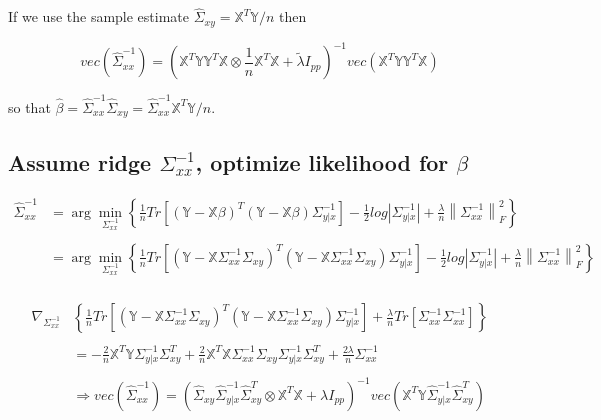 \documentclass[11pt,]{book}
\theoremstyle{definition}
\theoremstyle{definition}
\theoremstyle{definition}
\theoremstyle{remark}
\begin{document}
If we use the sample estimate
\(\hat{\Sigma}_{xy} = \mathbb{X}^{T}\mathbb{Y}/n\) then

\[ vec\left( \hat{\Sigma}_{xx}^{-1} \right) = \left( \mathbb{X}^{T}\mathbb{Y}\mathbb{Y}^{T}\mathbb{X} \otimes \frac{1}{n}\mathbb{X}^{T}\mathbb{X} + \tilde{\lambda}I_{pp} \right)^{-1}vec\left( \mathbb{X}^{T}\mathbb{Y}\mathbb{Y}^{T}\mathbb{X} \right) \]

so that
\(\hat{\beta} = \hat{\Sigma}_{xx}^{-1}\hat{\Sigma}_{xy} = \hat{\Sigma}_{xx}^{-1}\mathbb{X}^{T}\mathbb{Y}/n\).

\vspace{0.5cm}

\hypertarget{assume-ridge-sigma_xx-1-optimize-likelihood-for-beta}{%
\subsection{\texorpdfstring{Assume ridge \(\Sigma_{xx}^{-1}\), optimize
likelihood for
\(\beta\)}{Assume ridge \textbackslash{}Sigma\_\{xx\}\^{}\{-1\}, optimize likelihood for \textbackslash{}beta}}\label{assume-ridge-sigma_xx-1-optimize-likelihood-for-beta}}

\begin{align*}
  \hat{\Sigma}_{xx}^{-1} &= \arg\min_{\Sigma_{xx}^{-1}}\left\{ \frac{1}{n} Tr\left[ \left(\mathbb{Y} - \mathbb{X}\beta \right)^{T}\left( \mathbb{Y} - \mathbb{X}\beta \right)\Sigma_{y | x}^{-1} \right] - \frac{1}{2}log\left| \Sigma_{y | x}^{-1} \right| + \frac{\lambda}{n}\left\| \Sigma_{xx}^{-1} \right\|_{F}^{2} \right\} \\
  & \\
  &= \arg\min_{\Sigma_{xx}^{-1}}\left\{ \frac{1}{n} Tr\left[ \left(\mathbb{Y} - \mathbb{X}\Sigma_{xx}^{-1}\Sigma_{xy} \right)^{T}\left( \mathbb{Y} - \mathbb{X}\Sigma_{xx}^{-1}\Sigma_{xy} \right)\Sigma_{y | x}^{-1} \right] - \frac{1}{2}log\left| \Sigma_{y | x}^{-1} \right| + \frac{\lambda}{n}\left\| \Sigma_{xx}^{-1} \right\|_{F}^{2} \right\} \\
\end{align*}

\begin{align*}
  \nabla_{\Sigma_{xx}^{-1}}&\left\{ \frac{1}{n}Tr\left[ \left(\mathbb{Y} - \mathbb{X}\Sigma_{xx}^{-1}\Sigma_{xy} \right)^{T}\left(\mathbb{Y} - \mathbb{X}\Sigma_{xx}^{-1}\Sigma_{xy} \right)\Sigma_{y | x}^{-1} \right] + \frac{\lambda}{n}Tr\left[ \Sigma_{xx}^{-1}\Sigma_{xx}^{-1} \right] \right\} \\
  & \\
  &= -\frac{2}{n}\mathbb{X}^{T}\mathbb{Y}\Sigma_{y | x}^{-1}\Sigma_{xy}^{T} + \frac{2}{n}\mathbb{X}^{T}\mathbb{X}\Sigma_{xx}^{-1}\Sigma_{xy}\Sigma_{y | x}^{-1}\Sigma_{xy}^{T} + \frac{2\lambda}{n}\Sigma_{xx}^{-1} \\
  & \\
  &\Rightarrow vec\left( \hat{\Sigma}_{xx}^{-1} \right) = \left(\hat{\Sigma}_{xy}\hat{\Sigma}_{y | x}^{-1}\hat{\Sigma}_{xy}^{T} \otimes \mathbb{X}^{T}\mathbb{X} + \lambda I_{pp} \right)^{-1}vec\left( \mathbb{X}^{T}\mathbb{Y}\hat{\Sigma}_{y | x}^{-1}\hat{\Sigma}_{xy}^{T} \right) \\
\end{align*}
\end{document}
